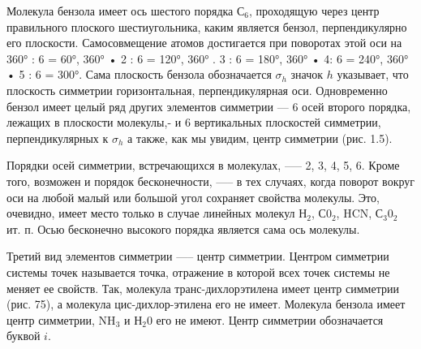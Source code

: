 Молекула бензола имеет ось шестого порядка $С_6$, проходящую через центр правильного 
плоского шестиугольника, каким является бензол, перпендикулярно его плоскости. 
Самосовмещение атомов достигается при поворотах этой оси на 360° : 6 = 60°, 360° • 2 : 6 = 120°, 360° . 3 : 6 = 180°, 360° • 4: 6 = 240°, 360° • 5 : 6 = 300°. Сама плоскость бензола обозначается $\sigma_h$ значок $h$ указывает, 
что плоскость симметрии горизонтальная, перпендикулярная оси. Одновременно бензол имеет целый ряд других 
элементов симметрии --- 6 осей второго порядка, лежащих в плоскости молекулы,- и 6 вертикальных
 плоскостей симметрии, перпендикулярных к $\sigma_h$ а также, как мы увидим, центр симметрии (рис. 1.5).

Порядки осей симметрии, встречающихся в молекулах, --— 2, 3, 4, 5, 6. Кроме того, возможен и порядок бесконечности, —-- в тех случаях, когда поворот вокруг оси на любой малый или большой угол сохраняет свойства молекулы. Это, очевидно, имеет место только в случае линейных молекул Н$_2$, С0$_2$, HCN, С$_3$0$_2$ ит. п. Осью бесконечно высокого порядка является сама ось молекулы.

Третий вид элементов симметрии —-- центр симметрии. Центром симметрии системы точек называется точка, отражение в которой всех точек системы не меняет ее свойств. Так, молекула транс-дихлорэтилена имеет центр симметрии (рис. 75), а молекула цис-дихлор-этилена его не имеет. Молекула бензола имеет центр симметрии, NH$_3$ и Н$_2$0 его не имеют. Центр симметрии обозначается буквой $i$.


